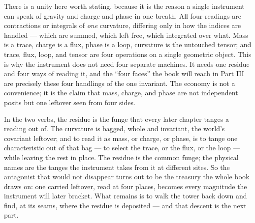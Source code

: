 There is a unity here worth stating, because it is the reason a single instrument can speak of gravity and charge and phase
in one breath. All four readings are contractions or integrals of \emph{one} curvature, differing only in how the indices are
handled --- which are summed, which left free, which integrated over what. Mass is a trace, charge is a flux, phase is a loop,
curvature is the untouched tensor; and trace, flux, loop, and tensor are four operations on a single geometric object. This
is why the instrument does not need four separate machines. It needs one residue and four ways of reading it, and the ``four
faces'' the book will reach in Part III are precisely these four handlings of the one invariant. The economy is not a
convenience; it is the claim that mass, charge, and phase are not independent posits but one leftover seen from four sides.

In the two verbs, the residue is the funge that every later chapter tanges a reading out of. The curvature is bagged, whole
and invariant, the world's covariant leftover; and to read it as mass, or charge, or phase, is to tange one characteristic
out of that bag --- to select the trace, or the flux, or the loop --- while leaving the rest in place. The residue is the
common funge; the physical names are the tanges the instrument takes from it at different sites. So the antagonist that would
not disappear turns out to be the treasury the whole book draws on: one carried leftover, read at four places, becomes every
magnitude the instrument will later bracket. What remains is to walk the tower back down and find, at its seams, where the
residue is deposited --- and that descent is the next part.
